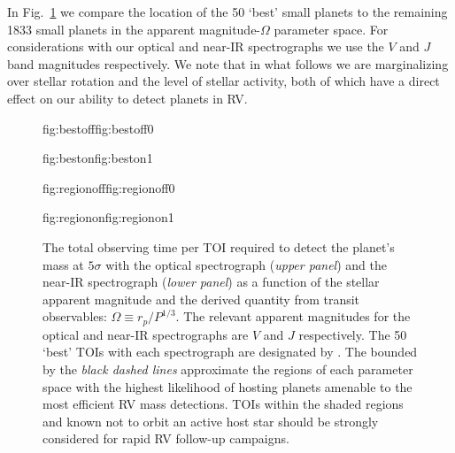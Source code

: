 In Fig.~\ref{fig:identify50} we compare the location of the 50 `best' small planets to the remaining
1833 small planets in the apparent magnitude-$\Omega$ parameter space. For considerations with our
optical and near-IR spectrographs we use the $V$ and $J$ band magnitudes respectively.
We note that in what follows we are marginalizing over stellar rotation and the level of stellar activity, both of
which have a direct effect on our ability to detect planets in RV.

\begin{figure}
  \centering
  \hspace{-\hsize}%
  \begin{ocg}{fig:bestoff}{fig:bestoff}{0}%
  \end{ocg}%
  \begin{ocg}{fig:beston}{fig:beston}{1}%
  \end{ocg}
  \hspace{-\hsize}%
  \begin{ocg}{fig:regionoff}{fig:regionoff}{0}%
  \end{ocg}%
  \begin{ocg}{fig:regionon}{fig:regionon}{1}%
  \end{ocg}
  \hspace{-\hsize}%
  \caption{The total observing time per TOI required to detect the planet's mass at $5\sigma$ with
    the optical spectrograph (\emph{upper panel}) and the near-IR spectrograph
    (\emph{lower panel}) as a function of the stellar apparent magnitude and the derived quantity from
    transit observables: $\Omega \equiv r_p/P^{1/3}$.
    The relevant apparent magnitudes for the optical and near-IR spectrographs are $V$ and $J$ respectively. 
    The 50 `best' TOIs with each spectrograph are designated by
    . The
    bounded by the \emph{black dashed lines} approximate the regions of each parameter space with the highest
    likelihood of hosting planets amenable to the most efficient RV mass detections.
    TOIs within the shaded regions and known not to orbit an active host star should be strongly considered
    for rapid RV follow-up campaigns.}
  \label{fig:identify50}
\end{figure}

